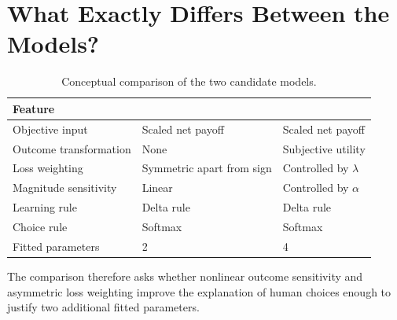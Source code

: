 \section{What Exactly Differs Between the Models?}

\begin{table}[H]
    \centering
    \caption{Conceptual comparison of the two candidate models.}\label{tab:model-comparison}
    \begin{tabular}{lll}
        \toprule
        Feature                & \QL{}                     & \PVL{}                    \\
        \midrule
        Objective input        & Scaled net payoff         & Scaled net payoff         \\
        Outcome transformation & None                      & Subjective utility        \\
        Loss weighting         & Symmetric apart from sign & Controlled by \(\lambda\) \\
        Magnitude sensitivity  & Linear                    & Controlled by \(\alpha\)  \\
        Learning rule          & Delta rule                & Delta rule                \\
        Choice rule            & Softmax                   & Softmax                   \\
        Fitted parameters      & 2                         & 4                         \\
        \bottomrule
    \end{tabular}
\end{table}

The comparison therefore asks whether nonlinear outcome sensitivity and asymmetric loss weighting improve the explanation of human choices enough to justify two additional fitted parameters.
